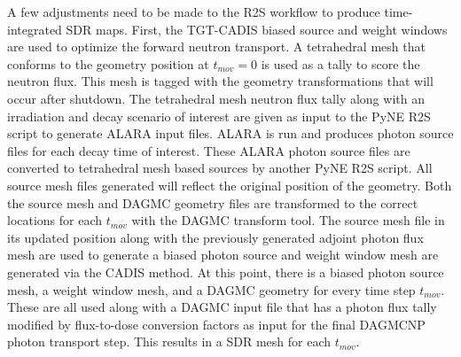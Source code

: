 A few adjustments need to be made to the R2S workflow to produce time-integrated
SDR maps.  First, the TGT-CADIS biased source and weight windows are used to
optimize the forward neutron transport.  A tetrahedral mesh that conforms to
the geometry position at $t_{mov}=0$ is used as a tally to score the neutron flux.
This mesh is tagged with the geometry transformations that will occur after
shutdown.  The tetrahedral mesh neutron flux tally along with an irradiation and decay
scenario of interest are given as input to the PyNE R2S
script to generate ALARA input files.  ALARA is run and produces photon source
files for each decay time of interest.  These ALARA photon source files are
converted to tetrahedral mesh based sources by another PyNE R2S script.  All
source mesh files generated will reflect the original position of the geometry.
Both the source mesh and DAGMC geometry files are transformed to the 
correct locations for each $t_{mov}$ with the DAGMC transform tool.
The source mesh file in its updated position along with the previously
generated adjoint photon flux mesh are used to generate a biased photon source 
and weight window mesh are generated via the CADIS method.  At this point,
there is a biased photon source mesh, a weight window mesh, and a DAGMC
geometry for every time step $t_{mov}$.  These are all used along with a DAGMC
input file that has a photon flux tally modified by flux-to-dose conversion
factors as input for the final DAGMCNP photon transport step.  This results in
a SDR mesh for each $t_{mov}$.  

 

